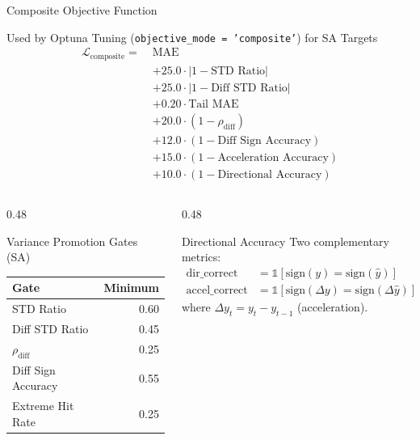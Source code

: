 \documentclass[aspectratio=169,10pt]{beamer}
\begin{document}
\begin{frame}{Composite Objective Function}
\begin{block}{Used by Optuna Tuning (\texttt{objective\_mode = 'composite'}) for SA Targets}
\begin{align*}
\mathcal{L}_{\text{composite}} = \;&\text{MAE} \\
  &+ 25.0 \cdot |1 - \text{STD Ratio}| \\
  &+ 25.0 \cdot |1 - \text{Diff STD Ratio}| \\
  &+ 0.20 \cdot \text{Tail MAE} \\
  &+ 20.0 \cdot (1 - \rho_{\text{diff}}) \\
  &+ 12.0 \cdot (1 - \text{Diff Sign Accuracy}) \\
  &+ 15.0 \cdot (1 - \text{Acceleration Accuracy}) \\
  &+ 10.0 \cdot (1 - \text{Directional Accuracy})
\end{align*}
\end{block}

\vspace{0.1cm}
\begin{columns}[T]
\begin{column}{0.48\textwidth}
\begin{exampleblock}{Variance Promotion Gates (SA)}
\scriptsize
\begin{tabular}{@{}lr@{}}
\toprule
\textbf{Gate} & \textbf{Minimum} \\
\midrule
STD Ratio & 0.60 \\
Diff STD Ratio & 0.45 \\
$\rho_{\text{diff}}$ & 0.25 \\
Diff Sign Accuracy & 0.55 \\
Extreme Hit Rate & 0.25 \\
\bottomrule
\end{tabular}
\end{exampleblock}
\end{column}
\begin{column}{0.48\textwidth}
\begin{block}{Directional Accuracy}
\footnotesize
Two complementary metrics:
\begin{align*}
\text{dir\_correct} &= \mathbb{1}[\text{sign}(y) = \text{sign}(\hat{y})] \\
\text{accel\_correct} &= \mathbb{1}[\text{sign}(\Delta y) = \text{sign}(\Delta \hat{y})]
\end{align*}
where $\Delta y_t = y_t - y_{t-1}$ (acceleration).
\end{block}
\end{column}
\end{columns}
\end{frame}
\end{document}
